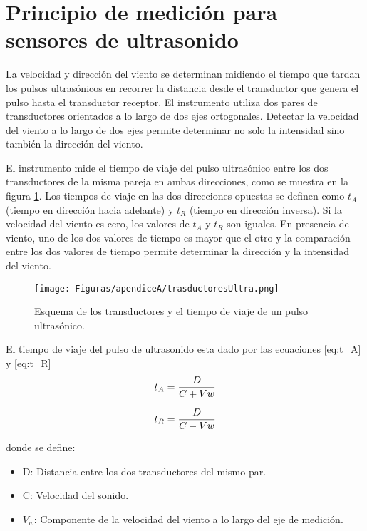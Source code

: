 \section{Principio de medición para sensores de ultrasonido}\label{ap:principioDeMedicionUltrasonido}

La velocidad y dirección del viento se determinan midiendo el tiempo que tardan los pulsos ultrasónicos en recorrer la distancia desde el transductor que genera el pulso hasta el transductor receptor. El instrumento utiliza dos pares de transductores orientados a lo largo de dos ejes ortogonales. Detectar la velocidad del viento a lo largo de dos ejes permite determinar no solo la intensidad sino también la dirección del viento.

El instrumento mide el tiempo de viaje del pulso ultrasónico entre los dos transductores de la misma pareja en ambas direcciones, como se muestra en la figura \ref{fig:trasductoresUltra}. Los tiempos de viaje en las dos direcciones opuestas se definen como $t_{A}$ (tiempo en dirección hacia adelante) y $t_{R}$ (tiempo en dirección inversa). Si la velocidad del viento es cero, los valores de $t_{A}$ y $t_{R}$ son iguales. En presencia de viento, uno de los dos valores de tiempo es mayor que el otro y la comparación entre los dos valores de tiempo permite determinar la dirección y la intensidad del viento.

\begin{figure}[H]
  \centering
  \texttt{[image: Figuras/apendiceA/trasductoresUltra.png]}
  \caption{Esquema de los transductores y el tiempo de viaje de un pulso ultrasónico. \cite{DeltaOHM_HD51.3D_manual}}
  \label{fig:trasductoresUltra}
\end{figure}

El tiempo de viaje del pulso de ultrasonido esta dado por las ecuaciones \ref{eq:t_A} y \ref{eq:t_R}
\begin{equation}
  t_{A} = \frac{D}{C + Vw}
  \centering
  \label{eq:t_A}
\end{equation}

\begin{equation}
  \centering
  t_{R} = \frac{D}{C - Vw}
  \label{eq:t_R}
\end{equation}

donde se define:
\begin{itemize}
  \item D: Distancia entre los dos transductores del mismo par.
  \item C: Velocidad del sonido.
  \item $V_{w}$: Componente de la velocidad del viento a lo largo del eje de medición.
\end{itemize}

